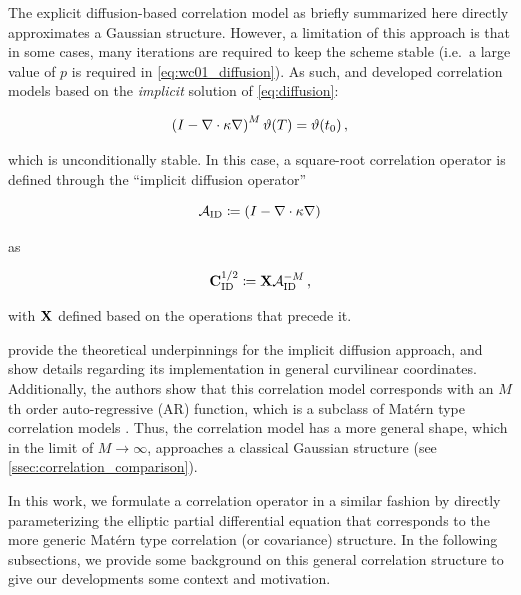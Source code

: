 The explicit diffusion-based correlation model as briefly summarized here
directly approximates a Gaussian structure.
However, a limitation of this approach is that in some cases, many
iterations are required to keep the scheme stable (i.e.\ a large value of $p$ is
required in \cref{eq:wc01_diffusion}).
As such, \citet{mirouze_representation_2010} and
\citet{carrier_background-error_2010} developed correlation models based on the
\textit{implicit} solution of \cref{eq:diffusion}:
\begin{linenomath*}\begin{equation}
    \left( I - \nabla\cdot\kappa\nabla\right)^M\vartheta(T) = \vartheta(t_0) \, ,
    \label{eq:implicit_diffusion}
\end{equation}\end{linenomath*}
which is unconditionally stable.
In this case, a square-root correlation operator is defined through the
``implicit diffusion operator''
\begin{linenomath*}\begin{equation}
    \mathcal{A}_\text{ID} \coloneqq \left(I - \nabla \cdot \kappa\nabla\right)
\end{equation}\end{linenomath*}
as
\begin{linenomath*}\begin{equation}
    \mathbf{C}^{1/2}_\text{ID} \coloneqq \mathbf{X} \mathcal{A}_\text{ID}^{-M} \, ,
\end{equation}\end{linenomath*}
with $\mathbf{X}$ defined based on the operations that precede it.

\citet{mirouze_representation_2010} provide the theoretical underpinnings for
the implicit diffusion approach, and show details regarding its implementation
in general curvilinear coordinates.
Additionally, the authors show that this correlation model corresponds
with an $M$th order auto-regressive (AR) function,
which is a subclass of
Mat\'ern type correlation models \citep[see][for more description of the
parameters controlling this model]{weaver_diffusion_2013}.
Thus, the correlation model has a more general shape, which in the limit of
$M\rightarrow\infty$, approaches a classical Gaussian structure (see
\cref{ssec:correlation_comparison}).

In this work, we formulate a correlation operator in a similar fashion by
directly parameterizing the
elliptic partial differential equation that corresponds to the more generic
Mat\'ern type correlation (or covariance) structure.
In the following subsections, we provide some background on this general correlation
structure to give our developments some context and motivation.

